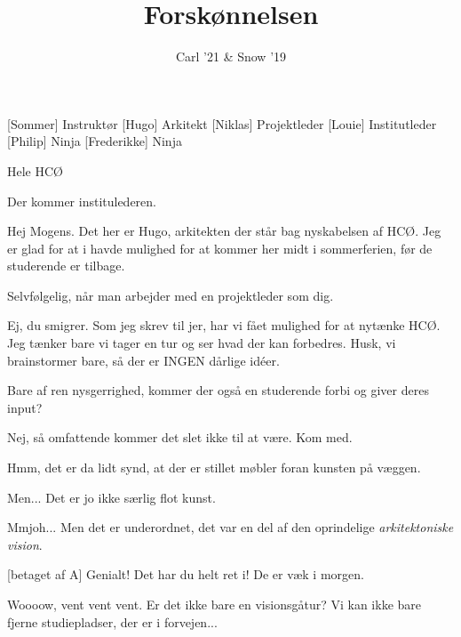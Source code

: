 \documentclass[a4paper,11pt]{article}
\title{Forskønnelsen}
\author{Carl '21 \& Snow '19}
\begin{document}
\maketitle

\begin{roles}
[Sommer] Instruktør
[Hugo] Arkitekt
[Niklas] Projektleder
[Louie] Institutleder
[Philip] Ninja
[Frederikke] Ninja
\end{roles}

\begin{props}
\item Hele HCØ
\end{props}

\begin{sketch}

 Der kommer institulederen.


 Hej Mogens. Det her er Hugo, arkitekten der står bag nyskabelsen af HCØ. Jeg er glad for at i havde mulighed for at kommer her midt i sommerferien, før de studerende er tilbage.

 Selvfølgelig, når man arbejder med en projektleder som dig.

 Ej, du smigrer. Som jeg skrev til jer, har vi fået mulighed for at nytænke HCØ. Jeg tænker bare vi tager en tur og ser hvad der kan forbedres. Husk, vi brainstormer bare, så der er INGEN dårlige idéer. 

 Bare af ren nysgerrighed, kommer der også en studerende forbi og giver deres input?

 Nej, så omfattende kommer det slet ikke til at være. Kom med.


 Hmm, det er da lidt synd, at der er stillet møbler foran kunsten på væggen.

 Men... Det er jo ikke særlig flot kunst.

 Mmjoh... Men det er underordnet, det var en del af den oprindelige \textit{arkitektoniske vision}.

[betaget af A] Genialt! Det har du helt ret i! De er væk i morgen. 

 Woooow, vent vent vent. Er det ikke bare en visionsgåtur? Vi kan ikke bare fjerne studiepladser, der er i forvejen...


\end{sketch}
\end{document}
